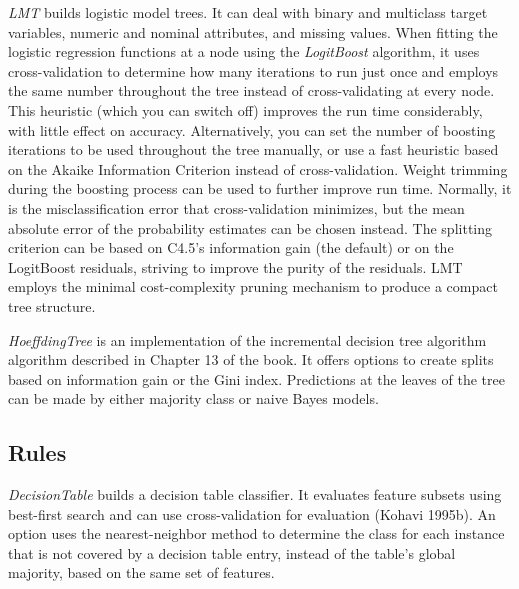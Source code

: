 \textit{LMT} builds logistic model trees. It can deal with binary and
multiclass target variables, numeric and nominal attributes, and
missing values. When fitting the logistic regression functions at a
node using the \textit{LogitBoost} algorithm, it uses cross-validation
to determine how many iterations to run just once and employs the same
number throughout the tree instead of cross-validating at every
node. This heuristic (which you can switch off) improves the run time
considerably, with little effect on accuracy. Alternatively, you can
set the number of boosting iterations to be used throughout the tree
manually, or use a fast heuristic based on the Akaike Information
Criterion instead of cross-validation. Weight trimming during the
boosting process can be used to further improve run time. Normally, it
is the misclassification error that cross-validation minimizes, but
the mean absolute error of the probability estimates can be chosen
instead. The splitting criterion can be based on C4.5's information
gain (the default) or on the LogitBoost residuals, striving to improve
the purity of the residuals. LMT employs the minimal cost-complexity
pruning mechanism to produce a compact tree structure.

\textit{HoeffdingTree} is an implementation of the incremental decision tree
algorithm algorithm described in Chapter 13 of the book. It offers options to
create splits based on information gain or the Gini index. Predictions
at the leaves of the tree can be made by either majority class or
naive Bayes models.

\subsection{Rules}

\textit{DecisionTable} builds a decision table classifier. It
evaluates feature subsets using best-first search and can use
cross-validation for evaluation (Kohavi 1995b). An option uses the
nearest-neighbor method to determine the class for each instance that
is not covered by a decision table entry, instead of the table's
global majority, based on the same set of features.

